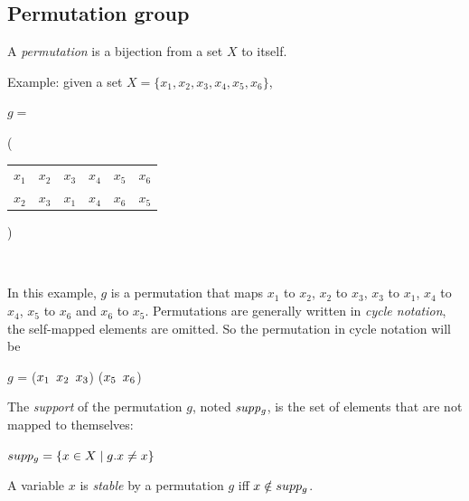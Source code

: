 \subsection{Permutation group}
\begin{definition}[Permutation]
 A \emph{permutation} is a bijection from a set $X$ to itself.
\end{definition}
Example: given a set $X = \{x_1, x_2, x_3, x_4, x_5, x_6\}$,
\begin{center}
$g = ${\Bigg( \begin{tabular}{cccccc}
  $x_1$ & $x_2$ & $x_3$ & $x_4$ & $x_5$ & $x_6$\\
  $x_2$ & $x_3$ & $x_1$ & $x_4$ & $x_6$ & $x_5$
 \end{tabular} \Bigg)}\\
\end{center}
In this example, $g$ is a permutation that maps $x_1$ to $x_2$, $x_2$ to $x_3$, $x_3$ to $x_1$, $x_4$ to $x_4$, $x_5$ to $x_6$ and $x_6$ to $x_5$.
Permutations are generally written in \emph{cycle notation}, the self-mapped elements are omitted.
So the permutation in cycle notation will be 
\begin{center}
 $g$ = ($x_1 \enskip x_2 \enskip x_3$) ($x_5 \enskip x_6$)
\end{center}
\begin{definition}
 The \emph{support} of the permutation $g$, noted $\mathit{supp_{g}}$, is the set of elements that are not mapped to themselves:
 \begin{center}
  $supp_{g} = \{ x \in X \mid g.x \neq x\}$
 \end{center}
\end{definition}

\begin{definition}
 A variable $x$ is \emph{stable} by a permutation $g$  iff $x \notin supp_g$.
\end{definition}
 
